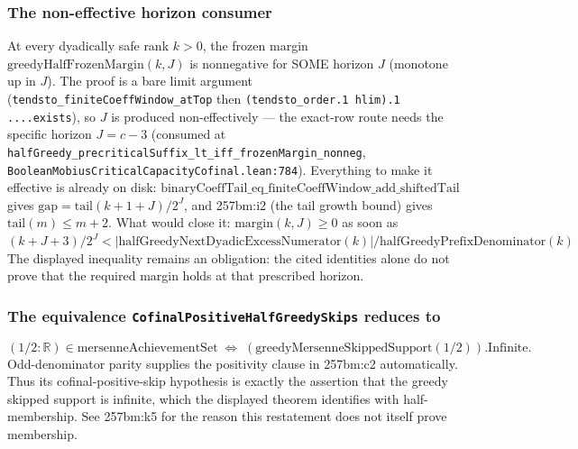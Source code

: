 \subsubsection*{The non-effective horizon consumer}

\begin{thm}
At every dyadically safe rank $k>0$, the frozen margin $\mathrm{greedyHalfFrozenMargin}(k,J)$ is
nonnegative for SOME horizon $J$ (monotone up in $J$). The proof is a bare limit argument
(\texttt{tendsto\_finiteCoeffWindow\_atTop} then \texttt{(tendsto\_order.1 hlim).1 ...\allowbreak.exists}), so $J$ is produced non-effectively — the exact-row route needs the specific horizon $J=c-3$ (consumed at \texttt{halfGreedy\_precriticalSuffix\_lt\_iff\_frozenMargin\_nonneg},
\texttt{BooleanMobiusCriticalCapacityCofinal.lean:784}). Everything to make it effective is
already on disk: $\mathrm{binaryCoeffTail\_eq\_finiteCoeffWindow\_add\_shiftedTail}$ gives
$\mathrm{gap} = \mathrm{tail}(k+1+J)/2^J$, and 257bm:i2 (the tail growth bound) gives
$\mathrm{tail}(m)\le m+2$. What would close it: $\mathrm{margin}(k,J)\ge0$ as soon as
$(k+J+3)/2^J < |\mathrm{halfGreedyNextDyadicExcessNumerator}(k)|/\mathrm{halfGreedyPrefixDenominator}(k)$
The displayed inequality remains an obligation: the cited identities alone do not prove that the required margin holds at that prescribed horizon.
\par\noindent{}    
\end{thm}

\subsubsection*{The equivalence \texttt{CofinalPositiveHalfGreedySkips} reduces to}

\begin{thm}
\[
(1/2:\mathbb{R})\in\mathrm{mersenneAchievementSet} \;\Longleftrightarrow\; (\mathrm{greedyMersenneSkippedSupport}(1/2)).\mathrm{Infinite}.
\]
Odd-denominator parity supplies the positivity clause in 257bm:c2 automatically. Thus its
cofinal-positive-skip hypothesis is exactly the assertion that the greedy skipped support is
infinite, which the displayed theorem identifies with half-membership. See 257bm:k5 for the
reason this restatement does not itself prove membership.
\par\noindent{}    
\end{thm}

